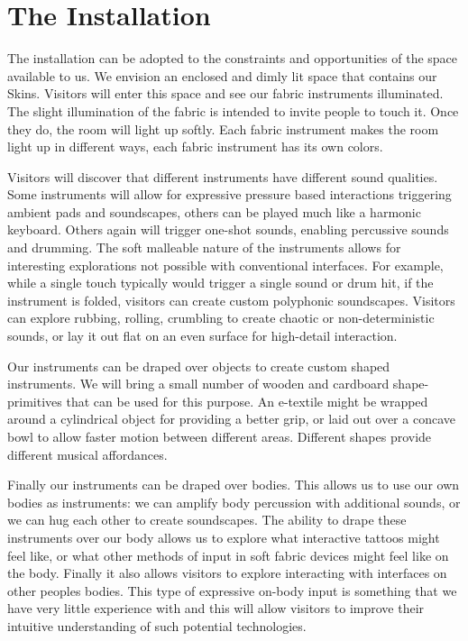 \documentclass{sigchi-ext}
\begin{document}
\section{The Installation}
The installation can be adopted to the constraints and opportunities of the space available to us. We envision an enclosed and dimly lit space that contains our Skins. Visitors will enter this space and see our fabric instruments illuminated. The slight illumination of the fabric is intended to invite people to touch it. Once they do, the room will light up softly. Each fabric instrument makes the room light up in different ways, each fabric instrument has its own colors.

Visitors will discover that different instruments have different sound qualities. Some instruments will allow for expressive pressure based interactions triggering ambient pads and soundscapes, others can be played much like a harmonic keyboard. Others again will trigger one-shot sounds, enabling percussive sounds and drumming. The soft malleable nature of the instruments allows for interesting explorations not possible with conventional interfaces. For example, while a single touch typically would trigger a single sound or drum hit, if the instrument is folded, visitors can create custom polyphonic soundscapes. Visitors can explore rubbing, rolling, crumbling to create chaotic or non-deterministic sounds, or lay it out flat on an even surface for high-detail interaction.

Our instruments can be draped over objects to create custom shaped instruments. We will bring a small number of wooden and cardboard shape-primitives that can be used for this purpose. An e-textile might be wrapped around a cylindrical object for providing a better grip, or laid out over a concave bowl to allow faster motion between different areas. Different shapes provide different musical affordances.

Finally our instruments can be draped over bodies. This allows us to use our own bodies as instruments: we can amplify body percussion with additional sounds, or we can hug each other to create soundscapes. The ability to drape these instruments over our body allows us to explore what interactive tattoos might feel like, or what other methods of input in soft fabric devices might feel like on the body. Finally it also allows visitors to explore interacting with interfaces on other peoples bodies. This type of expressive on-body input is something that we have very little experience with and this will allow visitors to improve their intuitive understanding of such potential technologies.
\end{document}
